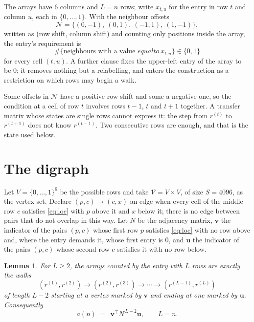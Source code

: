 \documentclass[11pt,a4paper]{article}
\theoremstyle{plain}
\newtheorem{lemma}[theorem]{Lemma}
\theoremstyle{definition}
\begin{document}
The arrays have $6$ columns and $L=n$ rows; write $x_{t,u}$ for the entry in
row $t$ and column $u$, each in $\{0,\dots,1\}$. With the neighbour offsets
\[
\mathcal N=\{(0,-1),\ (0,1),\ (-1,1),\ (1,-1)\},
\]
written as (row shift, column shift) and counting only positions inside the array, the
entry's requirement is
\begin{equation}\label{eq:loc}
\#\{\text{neighbours with a value }equal to\ x_{t,u}\}\in\{0,1\}
\end{equation}
for every cell $(t,u)$. A further clause fixes the upper-left entry of the array to be $0$; it removes nothing but a relabelling, and enters the construction as a restriction on which rows may begin a walk.

Some offsets in $\mathcal N$ have a positive row shift and some a negative one, so the
condition at a cell of row $t$ involves rows $t-1$, $t$ and $t+1$ together. A transfer
matrix whose states are single rows cannot express it: the step from $r^{(t)}$ to
$r^{(t+1)}$ does not know $r^{(t-1)}$. Two consecutive rows are enough, and that is
the state used below.

\section{The digraph}

Let $V=\{0,\dots,1\}^{6}$ be the possible rows and take
$\mathcal V=V\times V$, of size $S=4096$, as the vertex set. Declare $(p,c)\to(c,x)$ an edge
when every cell of the middle row $c$ satisfies \eqref{eq:loc} with $p$ above it and $x$
below it; there is no edge between pairs that do not overlap in this way. Let $N$ be the
adjacency matrix, $\mathbf{v}$ the indicator of the pairs $(p,c)$ whose first row $p$
satisfies \eqref{eq:loc} with no row above and, where the entry demands it, whose first entry is $0$, and $\mathbf{u}$ the indicator of
the pairs $(p,c)$ whose second row $c$ satisfies it with no row below.

\begin{lemma}\label{lem:walk}
For $L\ge2$, the arrays counted by the entry with $L$ rows are exactly the walks
\[
(r^{(1)},r^{(2)})\to(r^{(2)},r^{(3)})\to\cdots\to(r^{(L-1)},r^{(L)})
\]
of length $L-2$ starting at a vertex marked by $\mathbf{v}$ and ending at one marked by
$\mathbf{u}$. Consequently
\[
a(n)\;=\;\,\mathbf{v}^{\!\top}N^{\,L-2}\mathbf{u},\qquad L=n .
\]
\end{lemma}
\end{document}
